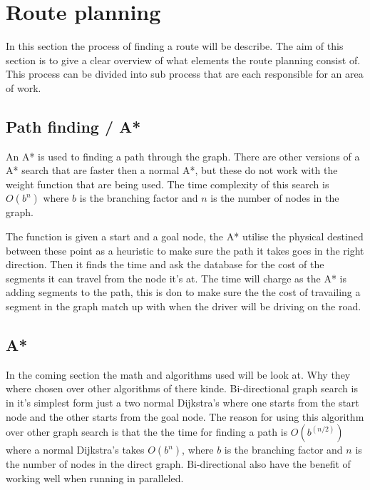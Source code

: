 \section{Route planning}
In this section the process of finding a route will be describe.
The aim of this section is to give a clear overview of what elements the route planning consist of.
This process can be divided into sub process that are each responsible for an area of work.

\subsection{Path finding / A*} \label{sec:pathfinding}
An A* is used to finding a path through the graph. There are other versions of a A* search that are faster then a normal A*, but these do not work with the weight function that are being used. The time complexity of this search is $O(b^n)$ where $b$ is the branching factor and $n$ is the number of nodes in the graph.

The function is given a start and a goal node, the A* utilise the physical destined between these point as a heuristic to make sure the path it takes goes in the right direction. Then it finds the time and ask the database for the cost of the segments it can travel from the node it's at. The time will charge as the A* is adding segments to the path, this is don to make sure the the cost of travailing a segment in the graph match up with when the driver will be driving on the road.

\subsection{A*} \label{algorithms}
In the coming section the math and algorithms used will be look at. Why they where chosen over other algorithms of there kinde.
Bi-directional graph search is in it's simplest form just a two normal Dijkstra’s where one starts from the start node and the other starts from the goal node.
The reason for using this algorithm over other graph search is that the the time for finding a path is $O(b^{(n/2)})$ where a normal Dijkstra’s takes $O(b^{n})$, where $b$ is the branching factor and $n$ is the number of nodes in the direct graph. Bi-directional also have the benefit of working well when running in paralleled.


